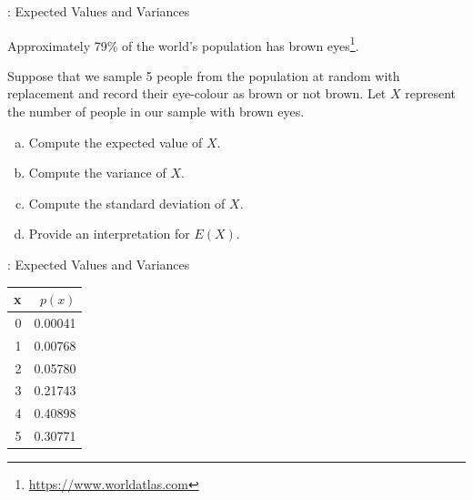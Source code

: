 \begin{frame}

  \begin{block}{\example: Expected Values and Variances}

    Approximately 79\% of the world's population has brown eyes\footnote{\url{https://www.worldatlas.com}}.

    \medskip
    
    Suppose that we sample 5 people from the population at random with replacement and record their eye-colour as brown or not brown. Let $X$ represent the number of people in our sample with brown eyes.

    \medskip
    
    
    \begin{enumerate}[a)]
    \item Compute the expected value of $X$. 
    \item Compute the variance of $X$.
    \item Compute the standard deviation of $X$.
    \item Provide an interpretation for $E(X)$.
    \end{enumerate}
    
  \end{block}
  
\end{frame}

\begin{frame}
\begin{block}{\examplectd: Expected Values and Variances}
\begin{table}[ht]
\centering
\begin{tabular}{rr}
  \hline
x & $p(x)$ \\ 
  \hline
     0 & 0.00041 \\ 
       1 & 0.00768 \\ 
       2 & 0.05780 \\ 
       3 & 0.21743 \\ 
       4 & 0.40898 \\ 
       5 & 0.30771 \\ 
   \hline
\end{tabular}
\end{table}

\end{block}
\end{frame}

